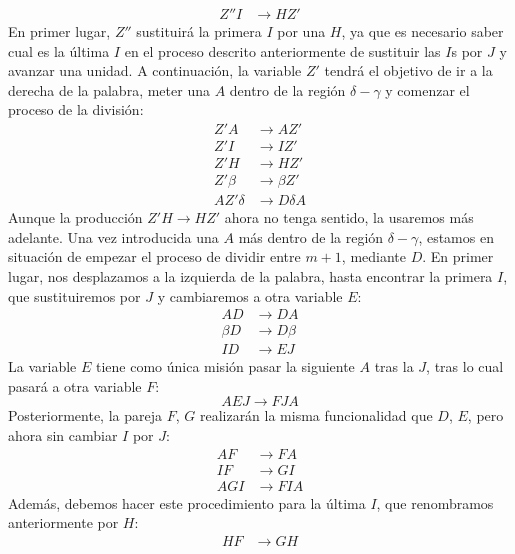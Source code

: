\begin{ejercicio}
\begin{enumerate}
\begin{align*}
            Z''I &\rightarrow HZ'
        \end{align*}
        En primer lugar, $Z''$ sustituirá la primera $I$ por una $H$, ya que es necesario saber cual es la última $I$ en el proceso descrito anteriormente de sustituir las $I$s por $J$ y avanzar una unidad. A continuación, la variable $Z'$ tendrá el objetivo de ir a la derecha de la palabra, meter una $A$ dentro de la región $\delta-\gamma$ y comenzar el proceso de la división:
        \begin{align*}
            Z'A &\rightarrow AZ' \\
            Z'I &\rightarrow IZ' \\
            Z'H &\rightarrow HZ' \\
            Z'\beta &\rightarrow \beta Z' \\
            AZ'\delta &\rightarrow D\delta A
        \end{align*}
        Aunque la producción $Z'H\rightarrow HZ'$ ahora no tenga sentido, la usaremos más adelante. Una vez introducida una $A$ más dentro de la región $\delta-\gamma$, estamos en situación de empezar el proceso de dividir entre $m+1$, mediante $D$. En primer lugar, nos desplazamos a la izquierda de la palabra, hasta encontrar la primera $I$, que sustituiremos por $J$ y cambiaremos a otra variable $E$:
        \begin{align*}
            AD &\rightarrow DA \\
            \beta D &\rightarrow D\beta \\
            ID &\rightarrow EJ
        \end{align*}
        La variable $E$ tiene como única misión pasar la siguiente $A$ tras la $J$, tras lo cual pasará a otra variable $F$:
        \begin{equation*}
            AEJ \rightarrow FJA
        \end{equation*}
        Posteriormente, la pareja $F$, $G$ realizarán la misma funcionalidad que $D$, $E$, pero ahora sin cambiar $I$ por $J$:
        \begin{align*}
            AF &\rightarrow FA \\
            IF &\rightarrow GI \\
            AGI &\rightarrow FIA 
        \end{align*}
        Además, debemos hacer este procedimiento para la última $I$, que renombramos anteriormente por $H$:
        \begin{align*}
            HF &\rightarrow GH \\

\end{align*}
\end{enumerate}
\end{ejercicio}
